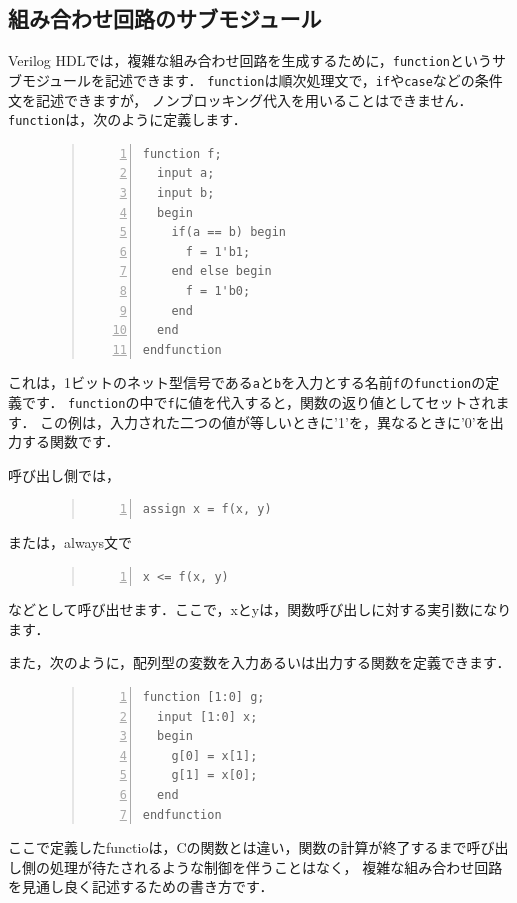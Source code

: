 \documentclass[a4paper,dvipdfmx]{jsarticle}
\begin{document}
\subsection{組み合わせ回路のサブモジュール}
Verilog HDLでは，複雑な組み合わせ回路を生成するために，\verb|function|というサブモジュールを記述できます．
\verb|function|は順次処理文で，\verb|if|や\verb|case|などの条件文を記述できますが，
ノンブロッキング代入を用いることはできません．\verb|function|は，次のように定義します．
\begin{figure}[H]
\begin{quote}
\begin{Verbatim}[frame=single, numbers=left, baselinestretch=0.8]
function f;
  input a;
  input b;
  begin
    if(a == b) begin
      f = 1'b1;
    end else begin
      f = 1'b0;
    end
  end
endfunction
\end{Verbatim}
\end{quote}
\end{figure}
これは，1ビットのネット型信号である\verb|a|と\verb|b|を入力とする名前\verb|f|の\verb|function|の定義です．
\verb|function|の中で\verb|f|に値を代入すると，関数の返り値としてセットされます．
この例は，入力された二つの値が等しいときに'1'を，異なるときに'0'を出力する関数です．

呼び出し側では，
\begin{figure}[H]
\begin{quote}
\begin{Verbatim}[frame=single, numbers=left, baselinestretch=0.8]
assign x = f(x, y)
\end{Verbatim}
\end{quote}
\end{figure}
または，always文で
\begin{figure}[H]
\begin{quote}
\begin{Verbatim}[frame=single, numbers=left, baselinestretch=0.8]
x <= f(x, y)
\end{Verbatim}
\end{quote}
\end{figure}
などとして呼び出せます．ここで，xとyは，関数呼び出しに対する実引数になります．

また，次のように，配列型の変数を入力あるいは出力する関数を定義できます．
\begin{figure}[H]
\begin{quote}
\begin{Verbatim}[frame=single, numbers=left, baselinestretch=0.8]
function [1:0] g; 
  input [1:0] x;
  begin
    g[0] = x[1];
    g[1] = x[0];
  end
endfunction
\end{Verbatim}
\end{quote}
\end{figure}
ここで定義したfunctioは，Cの関数とは違い，関数の計算が終了するまで呼び出し側の処理が待たされるような制御を伴うことはなく，
複雑な組み合わせ回路を見通し良く記述するための書き方です．
\end{document}

